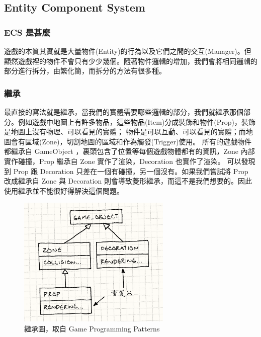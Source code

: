 \subsection{Entity Component System} %
\label{sub:Entity Component System}

\subsubsection{ECS 是甚麼}
遊戲的本質其實就是大量物件(Entity)的行為以及它們之間的交互(Manager)。但顯然遊戲裡的物件不會只有少少幾個。隨著物件邏輯的增加，我們會將相同邏輯的部分進行拆分，由繁化簡，而拆分的方法有很多種。

\subsubsection{繼承}

最直接的寫法就是繼承，當我們的實體需要哪些邏輯的部分，我們就繼承那個部分。例如遊戲中地圖上有許多物品，這些物品(Item)分成裝飾和物件(Prop)，裝飾是地圖上沒有物理、可以看見的實體；
物件是可以互動、可以看見的實體；而地圖會有區域(Zone)，切割地圖的區域和作為觸發(Trigger)使用。
所有的遊戲物件都繼承自 GameObject ，裏頭包含了位置等每個遊戲物體都有的資訊，Zone 內部實作碰撞，Prop 繼承自 Zone 實作了渲染，Decoration 也實作了渲染。
可以發現到 Prop 跟 Decoration 只差在一個有碰撞，另一個沒有。如果我們嘗試將 Prop 改成繼承自 Zone 與 Decoration 則會導致菱形繼承，而這不是我們想要的。因此使用繼承並不能很好得解決這個問題。

\begin{figure}[h]
    \begin{center}
        \includegraphics[width=0.65\textwidth]{./resources/ecs/inherit.png}
    \end{center}
\caption*{繼承圖，取自 Game Programming Patterns}
\label{fig:inherit}
\end{figure}

